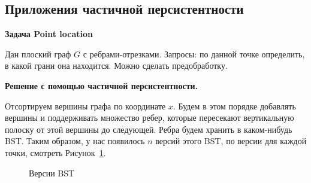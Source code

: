\subsection*{Приложения частичной персистентности}

{\bf Задача Point location}

Дан плоский граф $G$ с ребрами-отрезками.
Запросы: по данной точке определить, в какой грани она находится.
Можно сделать предобработку. 





{\bf Решение с помощью частичной персистентности.}

Отсортируем вершины графа по координате $x$. 
Будем в этом порядке добавлять вершины и поддерживать множество ребер, которые пересекают вертикальную полоску от этой вершины до следующей.
Ребра будем хранить в каком-нибудь BST.
Таким образом, у нас появилось $n$ версий этого BST, по версии для каждой точки, смотреть Рисунок~\ref{fig:TanyaBST}.

\begin{figure}[h] \centering
{}
	\caption{Версии BST}
	\label{fig:TanyaBST}
\end{figure}

